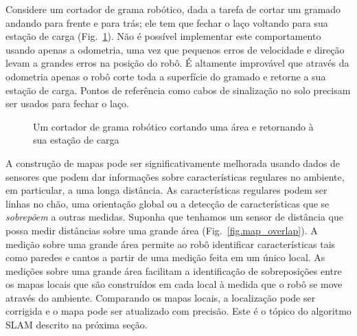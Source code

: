 Considere um cortador de grama robótico, dada a tarefa de cortar um gramado andando para frente e para trás; ele tem que fechar o laço voltando para sua estação de carga (Fig.~\ref{fig.lawn}). Não é possível implementar este comportamento usando apenas a odometria, uma vez que pequenos erros de velocidade e direção levam a grandes erros na posição do robô. É altamente improvável que através da odometria apenas o robô corte toda a superfície do gramado e retorne a sua estação de carga. Pontos de referência como cabos de sinalização no solo precisam ser usados para fechar o laço.

\begin{figure}
\begin{center}
\end{center}
\caption{Um cortador de grama robótico cortando uma área e retornando à sua estação de carga}\label{fig.lawn}
\end{figure}

A construção de mapas pode ser significativamente melhorada usando dados de sensores que podem dar informações sobre características regulares no ambiente, em particular, a uma longa distância. As características regulares podem ser linhas no chão, uma orientação global ou a detecção de características que se \emph{sobrepõem} a outras medidas. Suponha que tenhamos um sensor de distância que possa medir distâncias sobre uma grande área (Fig.~\ref{fig.map_overlap}). A medição sobre uma grande área permite ao robô identificar características tais como paredes e cantos a partir de uma medição feita em um único local. As medições sobre uma grande área facilitam a identificação de sobreposições entre os mapas locais que são construídos em cada local à medida que o robô se move através do ambiente. Comparando os mapas locais, a localização pode ser corrigida e o mapa pode ser atualizado com precisão. Este é o tópico do algoritmo SLAM descrito na próxima seção.

